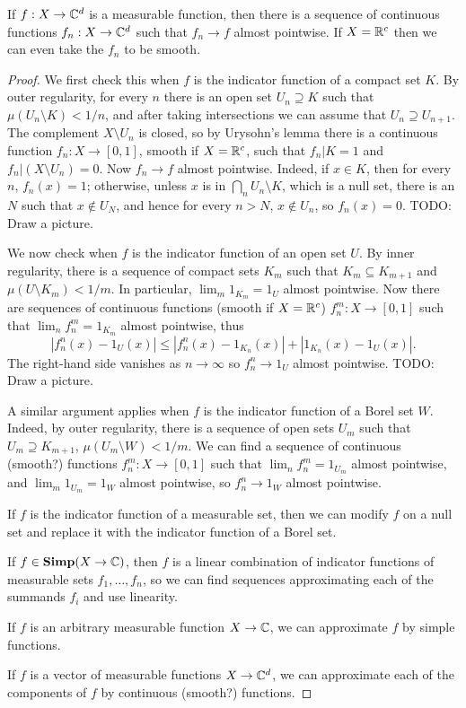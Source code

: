 \begin{lemma}
\label{smooth functions are pointwise dense}
If $f: X \to \mathbb{C}^d$ is a measurable function, then there is a sequence of continuous functions $f_n: X \to \mathbb{C}^d$ such that $f_n \to f$ almost pointwise.
If $X = \mathbb{R}^c$ then we can even take the $f_n$ to be smooth.
\end{lemma}
\begin{proof}
We first check this when $f$ is the indicator function of a compact set $K$.
By outer regularity, for every $n$ there is an open set $U_n \supseteq K$ such that $\mu(U_n \setminus K) < 1/n$, and after taking intersections we can assume that $U_n \supseteq U_{n+1}$.
The complement $X \setminus U_n$ is closed, so by Urysohn's lemma there is a continuous function $f_n: X \to [0, 1]$, smooth if $X = \mathbb{R}^c$, such that $f_n|K = 1$ and $f_n|(X \setminus U_n) = 0$.
Now $f_n \to f$ almost pointwise. Indeed, if $x \in K$, then for every $n$, $f_n(x) = 1$; otherwise, unless $x$ is in $\bigcap_n U_n \setminus K$, which is a null set, there is an $N$ such that $x \notin U_N$, and hence for every $n > N$, $x \notin U_n$, so $f_n(x) = 0$.
TODO: Draw a picture.

We now check when $f$ is the indicator function of an open set $U$.
By inner regularity, there is a sequence of compact sets $K_m$ such that $K_m \subseteq K_{m+1}$ and $\mu(U \setminus K_m) < 1/m$.
In particular, $\lim_m 1_{K_m} = 1_U$ almost pointwise.
Now there are sequences of continuous functions (smooth if $X = \mathbb{R}^c$) $f_n^m: X \to [0, 1]$ such that $\lim_n f_n^m = 1_{K_m}$ almost pointwise, thus
$$|f_n^n(x) - 1_U(x)| \leq |f_n^n(x) - 1_{K_n}(x)| + |1_{K_n}(x) - 1_U(x)|.$$
The right-hand side vanishes as $n \to \infty$ so $f_n^n \to 1_U$ almost pointwise.
TODO: Draw a picture.

A similar argument applies when $f$ is the indicator function of a Borel set $W$.
Indeed, by outer regularity, there is a sequence of open sets $U_m$ such that $U_m \supseteq K_{m+1}$, $\mu(U_m \setminus W) < 1/m$.
We can find a sequence of continuous (smooth?) functions $f_n^m: X \to [0, 1]$ such that $\lim_n f_n^m = 1_{U_m}$ almost pointwise, and $\lim_m 1_{U_m} = 1_W$ almost pointwise, so $f_n^n \to 1_W$ almost pointwise.

If $f$ is the indicator function of a measurable set, then we can modify $f$ on a null set and replace it with the indicator function of a Borel set.

If $f \in \mathbf{Simp}(X \to \mathbb{C})$, then $f$ is a linear combination of indicator functions of measurable sets $f_1, \dots, f_n$, so we can find sequences approximating each of the summands $f_i$ and use linearity.

If $f$ is an arbitrary measurable function $X \to \mathbb{C}$, we can approximate $f$ by simple functions.

If $f$ is a vector of measurable functions $X \to \mathbb{C}^d$, we can approximate each of the components of $f$ by continuous (smooth?) functions.
\end{proof}

